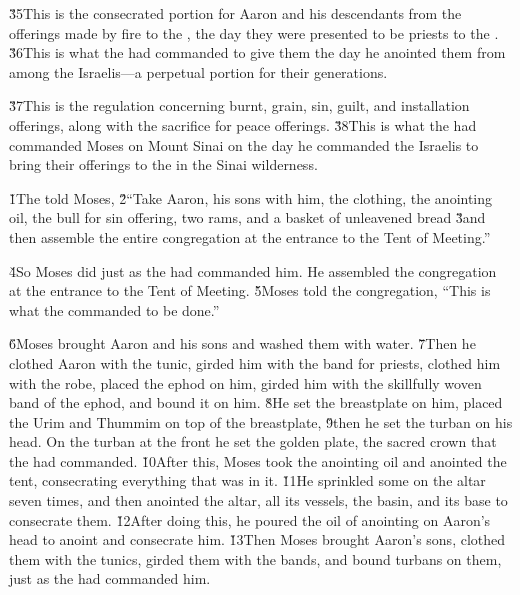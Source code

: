 \v{35}This is the consecrated portion for Aaron and his descendants from the offerings made by fire to the , the day they were presented to be priests to the . \v{36}This is what the  had commanded to give them the day he anointed them from among the Israelis---a perpetual portion for their generations.

\v{37}This is the regulation concerning burnt, grain, sin, guilt, and installation offerings, along with the sacrifice for peace offerings. \v{38}This is what the  had commanded Moses on Mount Sinai on the day he commanded the Israelis to bring their offerings to the  in the Sinai wilderness.

\v{1}The  told Moses, \v{2}``Take Aaron, his sons with him, the clothing, the anointing oil, the bull for sin offering, two rams, and a basket of unleavened bread \v{3}and then assemble the entire congregation at the entrance to the Tent of Meeting.''

\v{4}So Moses did just as the  had commanded him. He assembled the congregation at the entrance to the Tent of Meeting. \v{5}Moses told the congregation, ``This is what the  commanded to be done.''

\v{6}Moses brought Aaron and his sons and washed them with water. \v{7}Then he clothed Aaron with the tunic, girded him with the band for priests, clothed him with the robe, placed the ephod on him, girded him with the skillfully woven band of the ephod, and bound it on him. \v{8}He set the breastplate on him, placed the Urim and Thummim on top of the breastplate, \v{9}then he set the turban on his head. On the turban at the front he set the golden plate, the sacred crown that the  had commanded. \v{10}After this, Moses took the anointing oil and anointed the tent, consecrating everything that was in it. \v{11}He sprinkled some on the altar seven times, and then anointed the altar, all its vessels, the basin, and its base to consecrate them. \v{12}After doing this, he poured the oil of anointing on Aaron's head to anoint and consecrate him. \v{13}Then Moses brought Aaron's sons, clothed them with the tunics, girded them with the bands, and bound turbans on them, just as the  had commanded him.

